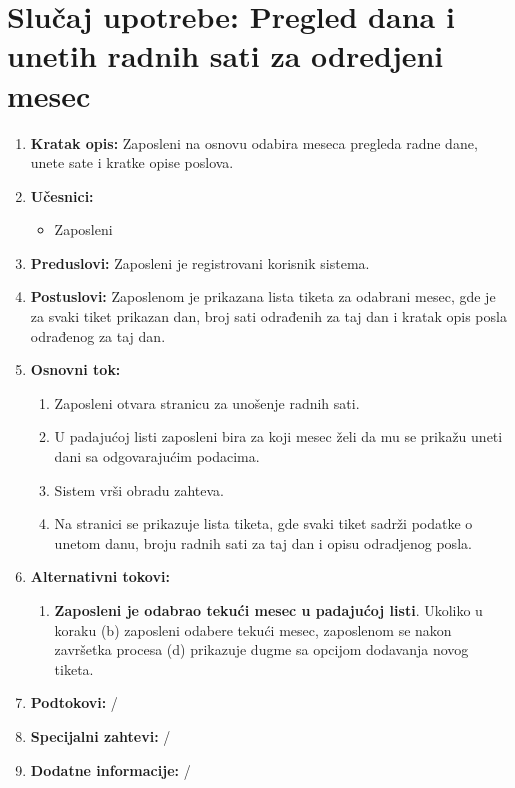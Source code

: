 \documentclass[a4paper]{article}
\begin{document}
\section{Slučaj upotrebe: Pregled dana i unetih radnih sati za odredjeni mesec}
\begin{enumerate}
    \item \textbf{Kratak opis:} Zaposleni na osnovu odabira meseca pregleda radne dane, unete sate i kratke opise poslova.
    \item \textbf{Učesnici:}
        \begin{itemize}
            \item Zaposleni
        \end{itemize}
    \item \textbf{Preduslovi:} Zaposleni je registrovani korisnik sistema.
    \item \textbf{Postuslovi:} Zaposlenom je prikazana lista tiketa za odabrani mesec, gde je za svaki tiket prikazan dan, broj sati odrađenih za taj dan i kratak opis posla odrađenog za taj dan.
    \item \textbf{Osnovni tok:}
        \begin{enumerate}
            \item Zaposleni otvara stranicu za unošenje radnih sati.
            \item U padajućoj listi zaposleni bira za koji mesec želi da mu se prikažu uneti dani sa odgovarajućim podacima.
            \item Sistem vrši obradu zahteva.
            \item Na stranici se prikazuje lista tiketa, gde svaki tiket sadrži podatke o unetom danu, broju radnih sati za taj dan i opisu odradjenog posla.
        \end{enumerate}
    \item \textbf{Alternativni tokovi:} 
        \begin{enumerate}
            \item \textbf{Zaposleni je odabrao tekući mesec u padajućoj listi}. Ukoliko u koraku (b) zaposleni odabere tekući mesec, zaposlenom se nakon završetka procesa (d) prikazuje dugme sa opcijom dodavanja novog tiketa.
        \end{enumerate}
    \item \textbf{Podtokovi:} /
    \item \textbf{Specijalni zahtevi:} /
    \item \textbf{Dodatne informacije:} /
\end{enumerate}
\end{document}
